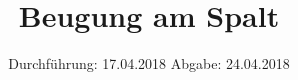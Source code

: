 

\subject{Versuch 406}
\title{Beugung am Spalt}
\date{%
  Durchführung: 17.04.2018
  \hspace{3em}
  Abgabe: 24.04.2018
}



\maketitle
\thispagestyle{empty}
\tableofcontents
\newpage






\printbibliography{}


